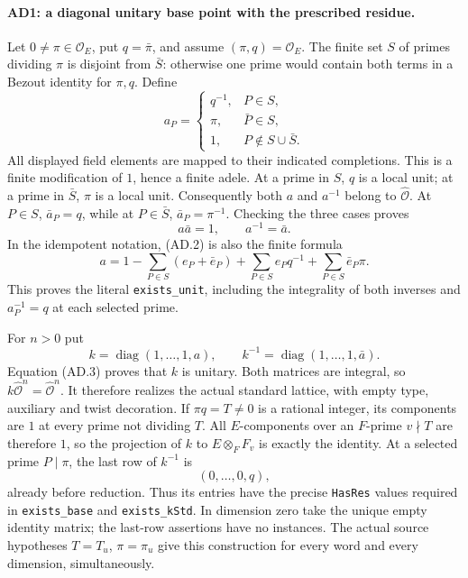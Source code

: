 \documentclass[11pt,a4paper]{article}
\numberwithin{equation}{section}
\theoremstyle{remark}\newtheorem{remark}[theorem]{Remark}
\begin{document}
\paragraph{AD1: a diagonal unitary base point with the prescribed residue.}
Let $0\ne\pi\in\mathcal O_E$, put $q=\bar\pi$, and assume
$(\pi,q)=\mathcal O_E$. The finite set $S$ of primes dividing
$\pi$ is disjoint from $\bar S$: otherwise one prime would
contain both terms in a Bezout identity for $\pi,q$.
Define
\[
 a_P=
 \begin{cases}
 q^{-1},&P\in S,\\
 \pi,&\bar P\in S,\\
 1,&P\notin S\cup\bar S.
 \end{cases}                                         \tag{AD.2}
\]
All displayed field elements are mapped to their indicated
completions. This is a finite modification of $1$, hence a finite
adele. At a prime in $S$, $q$ is a local unit; at a prime in
$\bar S$, $\pi$ is a local unit. Consequently both $a$ and
$a^{-1}$ belong to $\widehat{\mathcal O}$. At $P\in S$,
$\bar a_P=q$, while at $P\in\bar S$, $\bar a_P=\pi^{-1}$.
Checking the three cases proves
\[
                 a\bar a=1,\qquad a^{-1}=\bar a.      \tag{AD.3}
\]
In the idempotent notation, (AD.2) is also the finite formula
\[
 a=1-\sum_{P\in S}(e_P+\bar e_P)
          +\sum_{P\in S}e_Pq^{-1}
          +\sum_{P\in S}\bar e_P\pi.
\]
This proves the literal \texttt{exists\_\allowbreak unit}, including the
integrality of both inverses and $a_P^{-1}=q$ at each selected prime.

For $n>0$ put
\[
 k=\operatorname{diag}(1,\ldots,1,a),\qquad
 k^{-1}=\operatorname{diag}(1,\ldots,1,\bar a).        \tag{AD.4}
\]
Equation (AD.3) proves that $k$ is unitary. Both matrices are
integral, so $k\widehat{\mathcal O}^{n}=
\widehat{\mathcal O}^{n}$. It therefore realizes the actual
standard lattice, with empty type, auxiliary and twist decoration.
If $\pi q=T\ne0$ is a rational integer, its components are $1$
at every prime not dividing $T$. All $E$-components over an
$F$-prime $v\nmid T$ are therefore $1$, so the projection of
$k$ to $E\otimes_FF_v$ is exactly the identity. At a selected
prime $P\mid\pi$, the last row of $k^{-1}$ is
\[
              (0,\ldots,0,q),                       \tag{AD.5}
\]
already before reduction. Thus its entries have the precise
\texttt{HasRes} values required in \texttt{exists\_\allowbreak base} and
\texttt{exists\_\allowbreak kStd}. In dimension zero take the unique empty
identity matrix; the last-row assertions have no instances.
The actual source hypotheses $T=T_u$, $\pi=\pi_u$ give this
construction for every word and every dimension, simultaneously.
\end{document}
